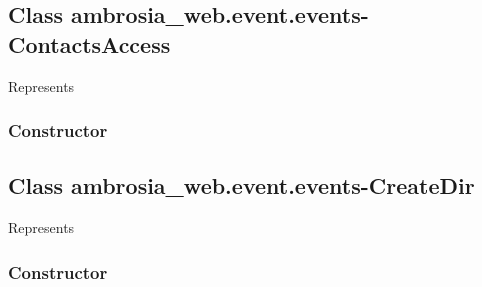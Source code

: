 \documentclass[letterpaper,10pt,english]{sphinxmanual}
\begin{document}
\begin{fulllineitems}
\label{ambrosia_web.event.events-ContactAccessEvent:ambrosia_web.event.events-ContactAccessEvent}
\end{fulllineitems}



\subsection{Class ambrosia\_web.event.events-ContactsAccess}
\label{ambrosia_web.event.events-ContactsAccess::doc}\label{ambrosia_web.event.events-ContactsAccess:class-ambrosia-web-event-events-contactsaccess}
Represents 


\subsubsection{Constructor}
\label{ambrosia_web.event.events-ContactsAccess:constructor}

\begin{fulllineitems}
\label{ambrosia_web.event.events-ContactsAccess:ambrosia_web.event.events-ContactsAccess}
\end{fulllineitems}



\subsection{Class ambrosia\_web.event.events-CreateDir}
\label{ambrosia_web.event.events-CreateDir::doc}\label{ambrosia_web.event.events-CreateDir:class-ambrosia-web-event-events-createdir}
Represents 


\subsubsection{Constructor}
\label{ambrosia_web.event.events-CreateDir:constructor}

\begin{fulllineitems}
\label{ambrosia_web.event.events-CreateDir:ambrosia_web.event.events-CreateDir}
\end{fulllineitems}
\end{document}

